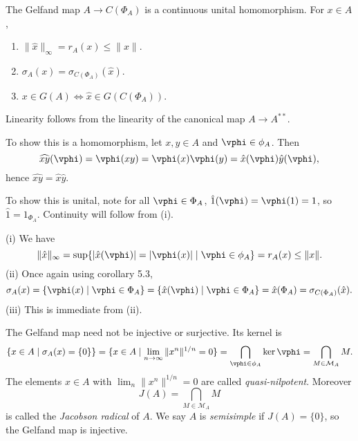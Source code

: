\documentclass[12pt]{article}
\begin{document}
\begin{theorem}
	The Gelfand map $A \to C(\Phi_A)$ is a continuous unital homomorphism. For $x \in A$,
	\begin{enumerate}[\normalfont(i)]
		\item $\|\hat x\|_\infty = r_A(x) \leq \|x\|$.
		\item $\sigma_A(x) = \sigma_{C(\Phi_A)}(\hat x)$.
		\item $x \in G(A) \iff \hat x \in G(C(\Phi_A))$.
	\end{enumerate}
\end{theorem}

\begin{proofbox}
	Linearity follows from the linearity of the canonical map $A \to A^{\ast\ast}$.

	To show this is a homomorphism, let $x, y \in A$ and $\vphi \in \phi_A$. Then
	\[
		\widehat{xy}(\vphi) = \vphi(xy) = \vphi(x) \vphi(y) = \hat x(\vphi) \hat y(\vphi),
	\]
	hence $\widehat{xy} = \hat x \hat y$.

	To show this is unital, note for all $\vphi \in \Phi_A$, $\hat 1 (\vphi) = \vphi(1) = 1$, so $\hat 1 = 1_{\Phi_A}$. Continuity will follow from (i).

	(i) We have
	\[
		\|\hat x\|_\infty = \sup \{ |\hat x(\vphi)| = |\vphi(x)| \mid \vphi \in \phi_A\} = r_A(x) \leq \|x\|.
	\]
	(ii) Once again using corollary 5.3,
	\[
		\sigma_A(x) = \{ \vphi(x) \mid \vphi \in \Phi_A\} = \{\hat x (\vphi) \mid \vphi \in \Phi_A\} = \hat x (\Phi_A) = \sigma_{C(\Phi_A)}(\hat x).
	\]
	(iii) This is immediate from (ii).
\end{proofbox}

\begin{remark}
	The Gelfand map need not be injective or surjective. Its kernel is
	\[
		\{x \in A \mid \sigma_A(x) = \{0\}\} = \{x \in A \mid \lim_{n \to \infty} \|x^n\|^{1/n} = 0\} = \bigcap_{\vphi \in \phi_A} \ker \vphi = \bigcap_{M \in \mathcal{M}_A} M.
	\]
	The elements $x \in A$ with $\lim_n \|x^n\|^{1/n} = 0$ are called \emph{quasi-nilpotent}. Moreover
	\[
	J(A) = \bigcap_{M \in \mathcal{M}_A} M
	\]
	is called the \emph{Jacobson radical} of $A$. We say $A$ is \emph{semisimple} if $J(A) = \{0\}$, so the Gelfand map is injective.
\end{remark}
\end{document}
